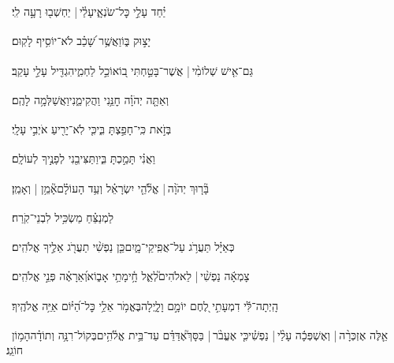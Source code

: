 \documentclass[12pt]{article}
\newcommand{\loc}[1]{\textsuperscript{\locf{#1}}}
\begin{document}
{\loc{ ח}~}‏יַ֗חַד עָלַ֣י  כׇּל־שֹׂנְאָ֑י{\hfill}עָלַ֓י |  יַחְשְׁב֖וּ רָעָ֣ה לִֽי׃\par

{\loc{ ט}~}‏ יָצ֣וּק בּ֑וֹ{\hfill}וַאֲשֶׁ֥ר שָׁ֝כַ֗ב לֹא־יוֹסִ֥יף לָקֽוּם׃\par

{\loc{ י}~}‏גַּם־אִ֤ישׁ שְׁלוֹמִ֨י | {\hfill}אֲשֶׁר־בָּטַ֣חְתִּי ב֭וֹ\newline\hspace*{.5em}אוֹכֵ֣ל לַחְמִ֑י{\hfill}הִגְדִּ֖יל עָלַ֣י עָקֵֽב׃\par

{\loc{ יא}~}‏וְאַתָּ֤ה יְהֹוָ֗ה חׇנֵּ֥נִי וַהֲקִימֵ֑נִי{\hfill}וַאֲשַׁלְּמָ֥ה לָהֶֽם׃\par

{\loc{ יב}~}‏בְּזֹ֣את  כִּֽי־חָפַ֣צְתָּ בִּ֑י{\hfill}כִּ֤י לֹֽא־יָרִ֖יעַ אֹיְבִ֣י עָלָֽי׃\par

{\loc{ יג}~}‏וַאֲנִ֗י  תָּמַ֣כְתָּ בִּ֑י{\hfill}וַתַּצִּיבֵ֖נִי לְפָנֶ֣יךָ לְעוֹלָֽם׃\par

{\loc{ יד}~}‏בָּ֘ר֤וּךְ יְהֹוָ֨ה | {\hfill}אֱלֹ֘הֵ֤י יִשְׂרָאֵ֗ל\newline\hspace*{.5em} וְעַ֥ד הָעוֹלָ֗ם{\hfill}אָ֘מֵ֥ן | וְאָמֵֽן׃\par\pend
\ledpb
\pstart[\subsection*{\textcolor{red}{פרק מב}}]\label{פרק מב}
{\loc{ א}~}‏לַמְנַצֵּ֗חַ מַשְׂכִּ֥יל לִבְנֵי־קֹֽרַח׃\par

{\loc{ ב}~}‏כְּאַיָּ֗ל תַּעֲרֹ֥ג עַל־אֲפִֽיקֵי־מָ֑יִם{\hfill}כֵּ֤ן נַפְשִׁ֨י תַעֲרֹ֖ג אֵלֶ֣יךָ אֱלֹהִֽים׃\par

{\loc{ ג}~}‏צָמְאָ֬ה נַפְשִׁ֨י |  לֵאלֹהִים֮{\hfill}לְאֵ֢ל חָ֥֫י\newline\hspace*{.5em}מָתַ֥י אָב֑וֹא{\hfill}וְ֝אֵרָאֶ֗ה פְּנֵ֣י אֱלֹהִֽים׃\par

{\loc{ ד}~}‏הָֽיְתָה־לִּ֬י דִמְעָתִ֣י לֶ֭חֶם יוֹמָ֣ם וָלָ֑יְלָה{\hfill}בֶּאֱמֹ֥ר אֵלַ֥י כׇּל־הַ֝יּ֗וֹם אַיֵּ֥ה אֱלֹהֶֽיךָ׃\par

{\loc{ ה}~}‏אֵ֤לֶּה אֶזְכְּרָ֨ה |  וְאֶשְׁפְּכָ֬ה עָלַ֨י |  נַפְשִׁ֗י{\hfill}כִּ֤י אֶעֱבֹ֨ר |  בַּסָּךְ֮\newline\hspace*{.5em}אֶדַּדֵּ֗ם עַד־בֵּ֥ית אֱלֹ֫הִ֥ים{\hfill}בְּקוֹל־רִנָּ֥ה וְתוֹדָ֗ה\newline\hspace*{.5em}הָמ֥וֹן חוֹגֵֽג׃\par
\end{document}
